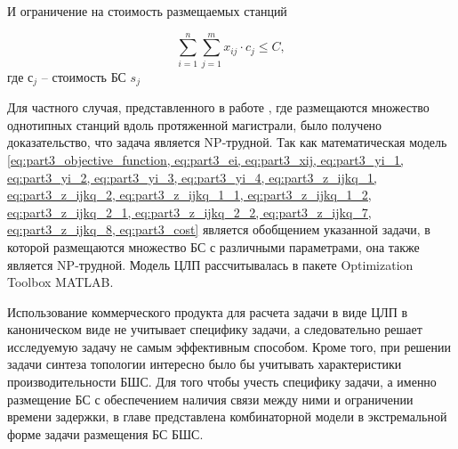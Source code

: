 И ограничение на стоимость размещаемых станций

\begin{equation}
  \label{eq:part3_cost}
  \sum\limits_{i=1}^n \sum\limits_{j=1}^m x_{ij} \cdot c_j \leq C,
\end{equation}
где $с_j$ -- стоимость БС $s_j$



Для частного случая, представленного в работе \cite{Ivanov2018}, где размещаются множество однотипных станций вдоль протяженной магистрали, было получено доказательство, что задача является NP-трудной. Так как математическая модель \cref{eq:part3_objective_function, eq:part3_ei, eq:part3_xij, eq:part3_yi_1, eq:part3_yi_2, eq:part3_yi_3, eq:part3_yi_4, eq:part3_z_ijkq_1, eq:part3_z_ijkq_2, eq:part3_z_ijkq_1_1, eq:part3_z_ijkq_1_2, eq:part3_z_ijkq_2_1, eq:part3_z_ijkq_2_2, eq:part3_z_ijkq_7, eq:part3_z_ijkq_8, eq:part3_cost} является обобщением указанной задачи, в которой размещаются множество БС с различными параметрами, она также является NP-трудной. Модель ЦЛП рассчитывалась в пакете Optimization Toolbox MATLAB.



Использование коммерческого продукта для расчета задачи в виде ЦЛП в каноническом виде не учитывает специфику задачи, а следовательно решает исследуемую задачу не самым эффективным способом. Кроме того, при решении задачи синтеза топологии интересно было бы учитывать характеристики производительности БШС. Для того чтобы учесть специфику задачи, а именно размещение БС с обеспечением наличия связи между ними и ограничении времени задержки, в главе представлена комбинаторной модели в экстремальной форме задачи размещения БС БШС.


